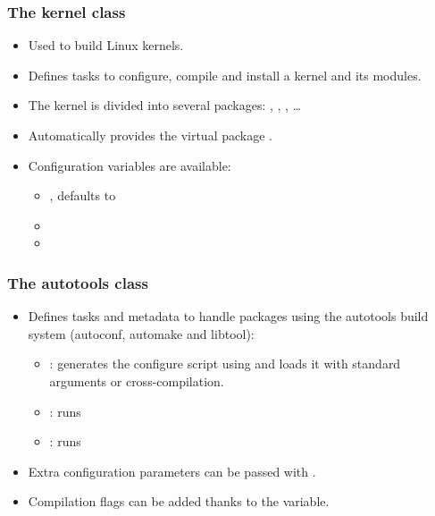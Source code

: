 \begin{frame}
  \frametitle{The kernel class}
  \begin{itemize}
    \item Used to build Linux kernels.
    \item Defines tasks to configure, compile and install a kernel and
          its modules.
    \item The kernel is divided into several packages: ,
          , ,
          \dots
    \item Automatically provides the virtual package
          .
    \item Configuration variables are available:
    \begin{itemize}
      \item {}, defaults to 
      \item {}
      \item {}
    \end{itemize}
  \end{itemize}
\end{frame}

\begin{frame}
  \frametitle{The autotools class}
  \begin{itemize}
    \item Defines tasks and metadata to handle packages using the
          autotools build system (autoconf, automake and libtool):
    \begin{itemize}
      \item {}: generates the configure script using
             and loads it with standard arguments or
            cross-compilation.
      \item {}: runs 
      \item {}: runs 
    \end{itemize}
    \item Extra configuration parameters can be passed with
          .
    \item Compilation flags can be added thanks to the
           variable.
  \end{itemize}
\end{frame}


